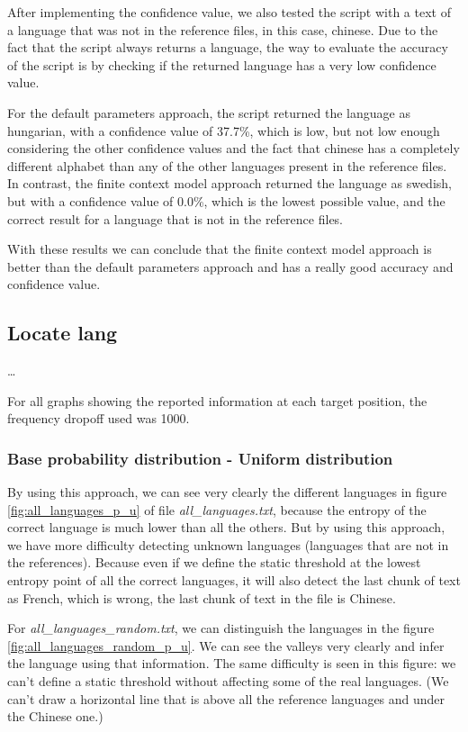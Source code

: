 \documentclass{article}
\begin{document}
After implementing the confidence value, we also tested the script with a text of a language that was not in the reference files, in this case, chinese.
Due to the fact that the script always returns a language, the way to evaluate the accuracy of the script is by checking if the returned language has a very low confidence value.

For the default parameters approach, the script returned the language as hungarian, with a confidence value of 37.7\%, which is low, but not low enough considering the other confidence values and
the fact that chinese has a completely different alphabet than any of the other languages present in the reference files.
In contrast, the finite context model approach returned the language as swedish, but with a confidence value of 0.0\%, which is the lowest possible value, and the correct result
for a language that is not in the reference files.

With these results we can conclude that the finite context model approach is better than the default parameters approach and has a really good accuracy and confidence value.

\subsection{Locate lang}
\label{subsec:results_locate_lang}

\dots

For all graphs showing the reported information at each target position, the frequency dropoff used was 1000.

\subsubsection{Base probability distribution - Uniform distribution}
\label{subsubsec:results_locate_lang_uniform_distribution}

By using this approach, we can see very clearly the different languages in figure \ref{fig:all_languages_p_u} of file \textit{all_languages.txt},
because the entropy of the correct language is much lower than all the others.
But by using this approach, we have more difficulty detecting unknown languages (languages that are not in the references).
Because even if we define the static threshold at the lowest entropy point of all the correct languages,
it will also detect the last chunk of text as French, which is wrong, the last chunk of text in the file is Chinese.

For \textit{all_languages_random.txt}, we can distinguish the languages in the figure \ref{fig:all_languages_random_p_u}.
We can see the valleys very clearly and infer the language using that information.
The same difficulty is seen in this figure: we can't define a static threshold without affecting some of the real languages.
(We can't draw a horizontal line that is above all the reference languages and under the Chinese one.)
\end{document}
